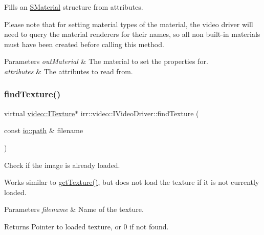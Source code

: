 Fills an \hyperlink{classirr_1_1video_1_1SMaterial}{S\+Material} structure from attributes. 

Please note that for setting material types of the material, the video driver will need to query the material renderers for their names, so all non built-\/in materials must have been created before calling this method. 
\begin{DoxyParams}{Parameters}
{\em out\+Material} & The material to set the properties for. \\
\hline
{\em attributes} & The attributes to read from. \\
\hline
\end{DoxyParams}
\mbox{\label{classirr_1_1video_1_1IVideoDriver_ad4eaed6d56b092e6805400ca59795de9}} 
\subsubsection{\texorpdfstring{find\+Texture()}{findTexture()}\hspace{0.1cm}{\footnotesize\ttfamily [1/2]}}
{\footnotesize\ttfamily virtual \hyperlink{classirr_1_1video_1_1ITexture}{video\+::\+I\+Texture}$\ast$ irr\+::video\+::\+I\+Video\+Driver\+::find\+Texture (\begin{DoxyParamCaption}\item[{const \hyperlink{namespaceirr_1_1io_a6468281622ce3a1c46b72e19f32dded5}{io\+::path} \&}]{filename }\end{DoxyParamCaption})\hspace{0.3cm}{\ttfamily [pure virtual]}}



Check if the image is already loaded. 

Works similar to \hyperlink{classirr_1_1video_1_1IVideoDriver_af4055165190e4adf221c6dc6f2434ea0}{get\+Texture()}, but does not load the texture if it is not currently loaded. 
\begin{DoxyParams}{Parameters}
{\em filename} & Name of the texture. \\
\hline
\end{DoxyParams}
\begin{DoxyReturn}{Returns}
Pointer to loaded texture, or 0 if not found. 
\end{DoxyReturn}
\mbox{\label{classirr_1_1video_1_1IVideoDriver_ad4eaed6d56b092e6805400ca59795de9}} 
